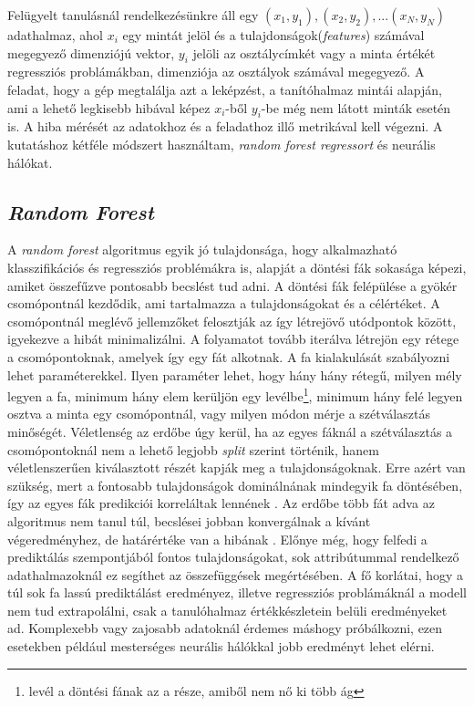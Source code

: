 \documentclass[12pt,letterpaper,oneside,openright]{book}
\begin{document}
\newline \indent
Felügyelt tanulásnál rendelkezésünkre áll egy $(x_1, y_1), (x_2, y_2),...(x_N, y_N)$ adathalmaz, ahol $x_i$ egy mintát jelöl és a tulajdonságok(\textit{features}) számával megegyező dimenziójú vektor, $y_i$ jelöli az osztálycímkét vagy a minta értékét regressziós problámákban, dimenziója az osztályok számával megegyező. A feladat, hogy a gép megtalálja azt a leképzést, a tanítóhalmaz mintái alapján, ami a lehető legkisebb hibával képez $x_i$-ből $y_i$-be még nem látott minták esetén is. A hiba mérését az adatokhoz és a feladathoz illő metrikával kell végezni. A kutatáshoz kétféle módszert használtam, \textit{random forest regressort} és neurális hálókat. 
\subsection{\textit{Random Forest}}
A \textit{random forest} algoritmus egyik jó tulajdonsága, hogy alkalmazható klasszifikációs és regressziós problémákra is, alapját a döntési fák sokasága képezi, amiket összefűzve pontosabb becslést tud adni. A döntési fák felépülése a gyökér csomópontnál kezdődik, ami tartalmazza a tulajdonságokat és a célértéket. A csomópontnál meglévő jellemzőket felosztják az így létrejövő utódpontok között, igyekezve a hibát minimalizálni. A folyamatot tovább iterálva létrejön egy rétege a csomópontoknak, amelyek így egy fát alkotnak. A fa kialakulását szabályozni lehet paraméterekkel. Ilyen paraméter lehet, hogy hány hány rétegű, milyen mély legyen a fa, minimum hány elem kerüljön egy levélbe\footnote{levél a döntési fának az a része, amiből nem nő ki több ág}, minimum hány felé legyen osztva a minta egy csomópontnál, vagy milyen módon mérje a szétválasztás minőségét. Véletlenség az erdőbe úgy kerül, ha az egyes fáknál a szétválasztás a csomópontoknál nem a lehető legjobb \textit{split} szerint történik, hanem véletlenszerűen kiválasztott részét kapják meg a  tulajdonságoknak. Erre azért van szükség, mert a fontosabb tulajdonságok dominálnának mindegyik fa döntésében, így az egyes fák predikciói korreláltak lennének \cite{randomF}. Az erdőbe több fát adva az algoritmus nem tanul túl, becslései jobban konvergálnak a kívánt végeredményhez, de határértéke van a hibának \cite{rf2}. Előnye még, hogy felfedi a prediktálás szempontjából fontos tulajdonságokat, 
sok attribútummal rendelkező adathalmazoknál ez segíthet az összefüggések megértésében. A fő korlátai, hogy a túl sok fa lassú prediktálást eredményez, illetve regressziós problámáknál a modell nem tud extrapolálni, csak a tanulóhalmaz értékkészletein belüli eredményeket ad. Komplexebb vagy zajosabb adatoknál érdemes máshogy próbálkozni, ezen esetekben például mesterséges neurális hálókkal jobb eredményt lehet elérni.
\end{document}

